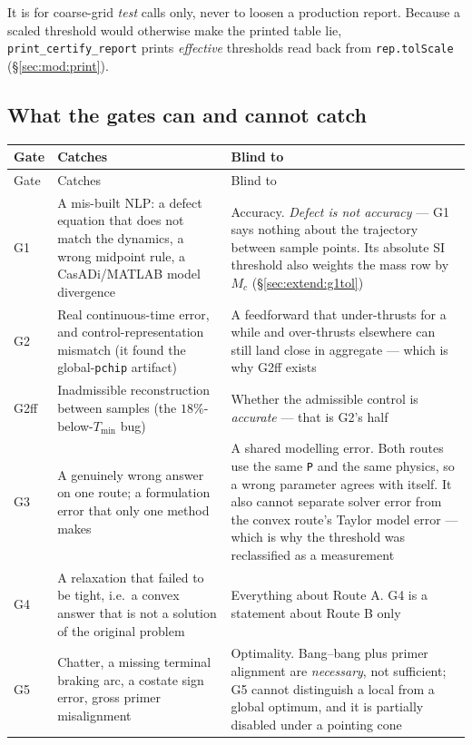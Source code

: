 \documentclass[11pt]{article}
\newcommand{\Tmin}{T_{\min}}
\begin{document}
It is for coarse-grid \emph{test} calls only, never to loosen a production
report. Because a scaled threshold would otherwise make the printed table
lie, \texttt{print\_certify\_report} prints \emph{effective} thresholds read
back from \texttt{rep.tolScale} (\S\ref{sec:mod:print}).

\subsection{What the gates can and cannot catch}

\begin{center}
\begin{longtable}{@{}lL{4.6cm}L{5.4cm}@{}}
\toprule
Gate & Catches & Blind to \\
\midrule
\endfirsthead
\toprule
Gate & Catches & Blind to \\
\midrule
\endhead
G1 & A mis-built NLP: a defect equation that does not match the dynamics,
a wrong midpoint rule, a CasADi/MATLAB model divergence &
Accuracy. \emph{Defect is not accuracy} --- G1 says nothing about the
trajectory between sample points. Its absolute SI threshold also weights the
mass row by $M_c$ (\S\ref{sec:extend:g1tol}) \\
G2 & Real continuous-time error, and control-representation mismatch (it
found the global-\texttt{pchip} artifact) &
A feedforward that under-thrusts for a while and over-thrusts elsewhere can
still land close in aggregate --- which is why G2ff exists \\
G2ff & Inadmissible reconstruction between samples (the $18\%$-below-$\Tmin$
bug) &
Whether the admissible control is \emph{accurate} --- that is G2's half \\
G3 & A genuinely wrong answer on one route; a formulation error that only
one method makes &
A shared modelling error. Both routes use the same \texttt{P} and the same
physics, so a wrong parameter agrees with itself. It also cannot separate
solver error from the convex route's Taylor model error --- which is why the
threshold was reclassified as a measurement \\
G4 & A relaxation that failed to be tight, i.e.\ a convex answer that is not
a solution of the original problem &
Everything about Route A. G4 is a statement about Route B only \\
G5 & Chatter, a missing terminal braking arc, a costate sign error, gross
primer misalignment &
Optimality. Bang--bang plus primer alignment are \emph{necessary}, not
sufficient; G5 cannot distinguish a local from a global optimum, and it is
partially disabled under a pointing cone \\
\bottomrule
\end{longtable}
\end{center}
\end{document}
